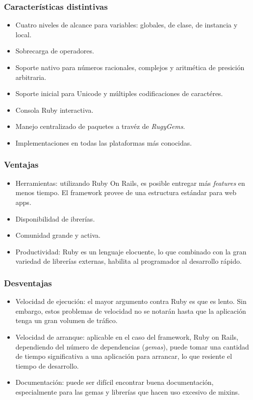 \documentclass{beamer}
\begin{document}

\begin{frame}
\frametitle{Caracter\'isticas distintivas}
\begin{itemize}
  \item Cuatro niveles de alcance para variables: globales, de clase, de instancia y local.
  \item Sobrecarga de operadores.
  \item Soporte nativo para n\'umeros racionales, complejos y aritm\'etica de presici\'on arbitraria.
  \item Soporte inicial para Unicode y m\'ultiples codificaciones de caract\'eres.
  \item Consola Ruby interactiva.
  \item Manejo centralizado de paquetes a trav\'ez de \emph{RugyGems}.
  \item Implementaciones en todas las plataformas m\'as conocidas.
\end{itemize}
\end{frame}


\begin{frame}
\frametitle{Ventajas}
\begin{itemize}
  \item Herramientas: utilizando Ruby On Rails, es posible entregar m\'as \emph{features} en menos tiempo. El framework provee de una estructura est\'andar para web apps.
  \item Disponibilidad de ibrer\'ias.
  \item Comunidad grande y activa.
  \item Productividad: Ruby es un lenguaje elocuente, lo que combinado con la gran variedad de librer\'ias externas, habilita al programador al desarrollo r\'apido.
\end{itemize}
\end{frame}


\begin{frame}
\frametitle{Desventajas}
\begin{itemize}
  \item Velocidad de ejecuci\'on: el mayor argumento contra Ruby es que es lento. Sin embargo, estos problemas de velocidad no se notar\'an hasta que la aplicaci\'on tenga un gran volumen de tr\'afico.
  \item Velocidad de arranque: aplicable en el caso del framework, Ruby on Rails, dependiendo del n\'umero de dependencias (\emph{gemas}), puede tomar una cantidad de tiempo significativa a una aplicaci\'on para arrancar, lo que resiente el tiempo de desarrollo.
  \item Documentaci\'on: puede ser dif\'icil encontrar buena documentaci\'on, especialmente para las gemas y librer\'ias que hacen uso excesivo de mixins.
\end{itemize}
\end{frame}
\end{document}
